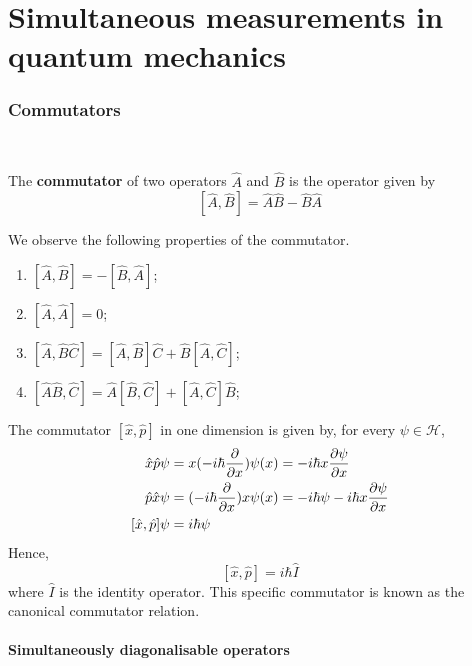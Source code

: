 \documentclass[a4paper]{article}
\begin{document}
\clearpage
\part{Simultaneous measurements in quantum mechanics}

\section{Commutators}
\ \vspace{-1.5em}

\begin{definition}
	The \textbf{commutator} of two operators \( \hat A \) and \( \hat B \) is the operator given by
	\[
		[\hat A, \hat B] = \hat A \hat B - \hat B \hat A
	\]
\end{definition}

We observe the following properties of the commutator.
\begin{enumerate}
	\item \( [\hat A, \hat B] = -[\hat B, \hat A] \);
	\item \( [\hat A, \hat A] = 0 \);
	\item \( [\hat A, \hat B \hat C] = [\hat A, \hat B] \hat C + \hat B [\hat A, \hat C] \);
	\item \( [\hat A \hat B, \hat C] = \hat A [\hat B, \hat C] + [\hat A, \hat C] \hat B \);
\end{enumerate}
\begin{example}
	The commutator \( [\hat x, \hat p] \) in one dimension is given by, for every \( \psi \in \mathcal H \),
	\begin{align*}
		\hat x \hat p \psi                   & = x (-i\hbar \pdv{x}) \psi(x) = -i\hbar x \pdv{\psi}{x}                 \\
		\hat p \hat x \psi                   & = (-i\hbar \pdv{x}) x \psi(x) = -i \hbar \psi - i \hbar x \pdv{\psi}{x} \\
		[\hat x, \hat p] \psi & = i \hbar \psi
	\end{align*}
	Hence,
	\[
		[\hat x, \hat p] = i \hbar \hat I
	\]
	where \( \hat I \) is the identity operator.
	This specific commutator is known as the canonical commutator relation.
\end{example}

\subsection{Simultaneously diagonalisable operators}\ \vspace*{-1.5em}
\end{document}
